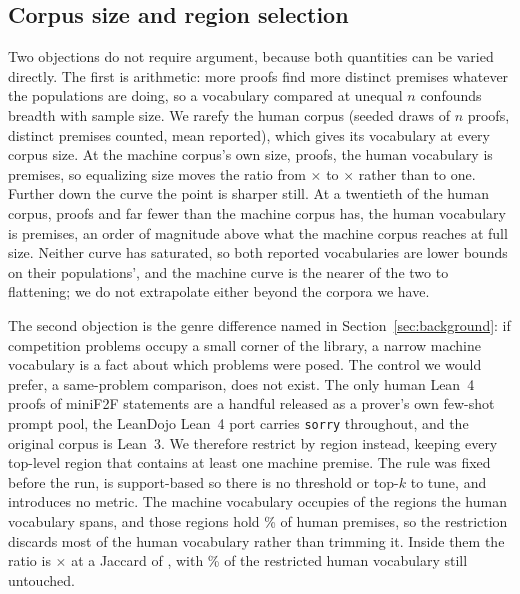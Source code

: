 
\subsection{Corpus size and region selection}
\label{sec:size-controls}

Two objections do not require argument, because both quantities can be varied
directly. The first is arithmetic: more proofs find more distinct premises
whatever the populations are doing, so a vocabulary compared at unequal $n$
confounds breadth with sample size. We rarefy the human corpus (seeded draws
of $n$ proofs, distinct premises counted, mean reported), which gives its
vocabulary at every corpus size. At the machine corpus's own size,
\machineProofs{} proofs, the human vocabulary is \humanVocabRarefied{}
premises, so equalizing size moves the ratio from \vocabRatio{}$\times$ to
\vocabRatioRarefied{}$\times$ rather than to one. Further down the curve the
point is sharper still. At a twentieth of the human corpus,
\rarefiedFivePctProofs{} proofs and far fewer than the machine corpus has, the
human vocabulary is \humanVocabRarefiedFivePct{} premises, an order of
magnitude above what the machine corpus reaches at full size. Neither curve has
saturated, so both reported vocabularies are lower bounds on their
populations', and the machine curve is the nearer of the two to flattening; we
do not extrapolate either beyond the corpora we have.

The second objection is the genre difference named in
Section~\ref{sec:background}: if competition problems occupy a small corner of
the library, a narrow machine vocabulary is a fact about which problems were
posed. The control we would prefer, a same-problem comparison, does not exist.
The only human Lean~4 proofs of miniF2F statements are a handful released as a
prover's own few-shot prompt pool, the LeanDojo Lean~4 port carries
\texttt{sorry} throughout, and the original corpus is Lean~3. We therefore
restrict by region instead, keeping every top-level region that contains at
least one machine premise. The rule was fixed before the run, is support-based so there
is no threshold or top-$k$ to tune, and introduces no metric. The machine
vocabulary occupies \areaRegionsMachine{} of the \areaRegionsHuman{} regions
the human vocabulary spans, and those regions hold \areaHumanSurvivalPct{}\% of
human premises, so the restriction discards most of the human vocabulary rather
than trimming it. Inside them the ratio is \areaRestrictedRatio{}$\times$ at a
Jaccard of \areaRestrictedJaccard{}, with \areaRestrictedHumanOnlyPct{}\% of
the restricted human vocabulary still untouched.

